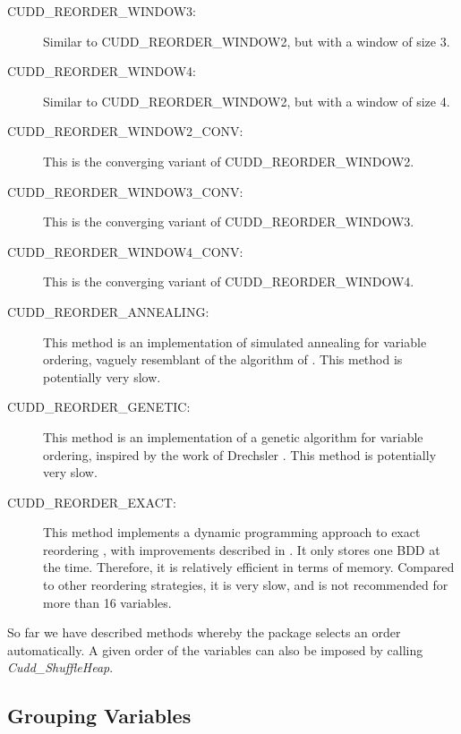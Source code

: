 \documentclass[11pt]{article}
\makeatletter
\newcommand{\eidx}[1]{\index{#1@\emph{#1}}}
\makeatother
\begin{document}
\begin{description}
\item[CUDD\_REORDER\_WINDOW3:] Similar
  to CUDD\_REORDER\_WINDOW2, but with a window of size 3.
\item[CUDD\_REORDER\_WINDOW4:] Similar
  to CUDD\_REORDER\_WINDOW2, but with a window of size 4.
\item[CUDD\_REORDER\_WINDOW2\_CONV:]
  This is the converging variant of
  CUDD\-\_REORDER\_WINDOW2.
\item[CUDD\_REORDER\_WINDOW3\_CONV:]
  This is the converging variant of CUDD\-\_REORDER\_WINDOW3.
\item[CUDD\_REORDER\_WINDOW4\_CONV:]
  This is the converging variant of CUDD\-\_REORDER\_WINDOW4.
\item[CUDD\_REORDER\_ANNEALING:] This
  method is an implementation of simulated
  annealing for variable
  ordering, vaguely resemblant of the algorithm of \cite{Bollig95}.
  This method is potentially very slow.
\item[CUDD\_REORDER\_GENETIC:] This
  method is an implementation of a genetic
  algorithm for variable ordering, inspired by the work of Drechsler
  \cite{Drechs95}. This method is potentially very slow.
\item[CUDD\_REORDER\_EXACT:] This method
  implements a dynamic programming approach to
  exact reordering
  \cite{Held62,Friedman90,Ishiur91}, with improvements described in
  \cite{Jeong93}. It only stores one BDD at the time. Therefore, it is
  relatively efficient in terms of memory.  Compared to other
  reordering strategies, it is very slow, and is not recommended for
  more than 16 variables.
\end{description}
So far we have described methods whereby the package selects an order
automatically. A given order of the variables can also be imposed by
calling \emph{Cudd\_ShuffleHeap}\eidx{Cudd\_ShuffleHeap}.

\subsection{Grouping Variables}
\label{sec:group}
\end{document}
